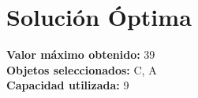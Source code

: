 \documentclass{article}
\begin{document}
\section*{Solución Óptima}
\textbf{Valor máximo obtenido:} 39\\
\textbf{Objetos seleccionados:} C, A\\
\textbf{Capacidad utilizada:} 9\\
\end{document}
